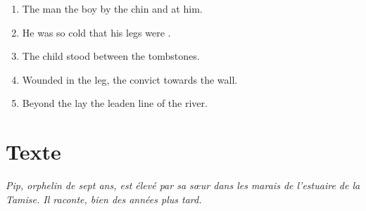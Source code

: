 \documentclass{fiche}
\begin{document}

\begin{anglais}
\begin{enumerate}[label=\arabic*.,itemsep=2mm,leftmargin=*]
  \item The man  the boy by the chin and  at him.
  \item He was so cold that his legs were .
  \item The child stood  between the tombstones.
  \item Wounded in the leg, the convict  towards the wall.
  \item Beyond the  lay the leaden line of the river.
\end{enumerate}
\end{anglais}

\newpage
\section{Texte}

\noindent\small\textit{Pip, orphelin de sept ans, est élevé par sa sœur dans les marais de
l'estuaire de la Tamise. Il raconte, bien des années plus tard.}\normalsize
\end{document}
